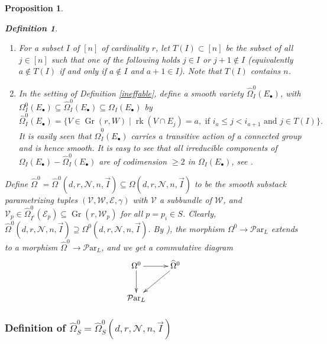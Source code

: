 \documentclass[11pt]{amsart}
\newcommand\bull{{\bullet}}
\newcommand\me{\mathcal{E}}
\newcommand\mv{\mathcal{V}}
\newcommand\mw{\mathcal{W}}
\newcommand\rk{\operatorname{rk}}
\newcommand\mn{\mathcal{N}}
\newcommand\ParL{\mathcal{P}\text{ar}_L}
\newcommand\Gr{\operatorname{Gr}}
\newtheorem{proposition}[theorem]{Proposition}
\newtheorem{defi}[theorem]{Definition}
\numberwithin{theorem}{subsection}
\begin{document}
{\begin{proposition}
\begin{defi}\label{ToI}
\hspace{2em}
\begin{enumerate}
\item For a subset $I$ of $[n]$ of cardinality $r$, let $T(I)\subset [n]$ be the subset of all $j\in [n]$ such that one of the following holds $j\in I$ or $j+1\not\in I$ (equivalently $a\not\in T(I)$ if and only if $a\not\in I$ and $a+1\in I$). Note that $T(I)$ contains $n$.
\item In the setting of Definition \ref{ineffable}, define a smooth variety $\widehat{\Omega}^0_I(E_{\bull})$, with $\Omega^0_I(E_{\bull})\subseteq \widehat{\Omega}^0_I(E_{\bull})\subseteq {\Omega}_I(E_{\bull})$ by
$$\widehat{\Omega}^0_I(E_{\bull})=\{V\in \Gr(r,W)\mid \rk (V\cap E_j)=a, \text{ if } i_a\leq j<i_{a+1}\text { and } j\in T(I)\}.$$
It is easily seen that  $\widehat{\Omega}^0_I(E_{\bull})$ carries a transitive action of a connected group and is hence smooth. It is easy to see that all irreducible components of
${\Omega}_I(E_{\bull})-\widehat{\Omega}^0_I(E_{\bull})$ are of codimension $\geq 2$ in ${\Omega}_I(E_{\bull})$, see \cite[Lemma 7.9]{BHermit}.
\end{enumerate}
\end{defi}
Define $\widehat{\Omega}^0=\widehat{\Omega}^0(d,r,\mn,n,\vec{I})\subseteq \Omega(d,r,\mn,n,\vec{I})$ to be the smooth substack parametrizing tuples $(\mv,\mw,\me,\gamma)$ with $\mv$ a subbundle of $\mw$, and $\mv_p\in \widehat{\Omega}^0_{I^i}(\me_p)\subseteq \Gr(r,\mw_p)$ for all $p=p_i\in S$. Clearly, $\widehat{\Omega}^0(d,r,\mn,n,\vec{I})\supseteq {\Omega}^0(d,r,\mn,n,\vec{I})$.
By \cite[Lemma 7.10]{BHermit}), the morphism  $\Omega^0 \to \ParL$ extends to a morphism $\widehat{\Omega}^0\to\ParL$, and we get a commutative diagram
 \begin{equation}\label{morph1}
\xymatrix{
 \Omega^0 \ar[r]\ar[d] &  \widehat{\Omega}^0\ar[dl]\\
\ParL
}
\end{equation}
\subsubsection{Definition of $\widehat{\Omega}_{S}^0=\widehat{\Omega}_{S}^0(d,r,\mn,n,\vec{I})$}


\end{proposition}}
\end{document}
